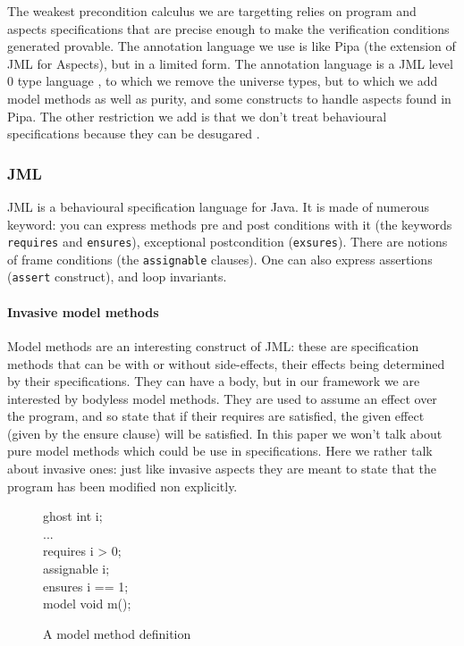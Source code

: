 The weakest precondition calculus we are targetting relies on program and aspects specifications that are
precise enough to make the verification conditions generated provable.
The annotation language we use is like Pipa \cite{ZhaoR03} (the extension
of JML for Aspects), but in a limited form. The annotation language is a JML level 0 type language 
\cite{Leavens-etal07}, to which
we remove the universe types, but to which we add model methods as well as purity, and some constructs
to handle aspects found in Pipa. The other restriction we add is that we don't treat behavioural specifications
because they can be desugared \cite{RaghavanL00}.

\subsubsection{JML} JML is a behavioural specification language for Java. It is made of numerous keyword: you 
can express methods pre and post conditions with it (the keywords {\tt requires} and {\tt ensures}), exceptional
postcondition ({\tt exsures}). There
are notions of frame conditions (the {\tt assignable} clauses). One can also express assertions ({\tt assert} 
construct), and loop invariants.

\paragraph{Invasive model methods} 
Model methods are an interesting construct of JML: these are specification
methods that can be with or without side-effects, their effects being determined by their specifications.
They can have a body, but in our framework we are interested by bodyless model methods. They are used to 
assume an effect over the program, and so state that if their requires are satisfied, the given effect (given by
the ensure clause) will be satisfied.
In this paper we won't talk about pure model methods which could be use in specifications. Here we rather talk
about invasive ones: just like invasive aspects they are meant to state that the program has been modified 
non explicitly.
\begin{figure}
\begin{center}\begin{minipage}{3cm}
\bcode
ghost int i;\\
...\\
requires i > 0;\\
assignable i;\\
ensures i == 1;\\
model void m();
\ecode
\end{minipage}\end{center}
\caption{A model method definition}
\label{model_meth_def}
\end{figure}


